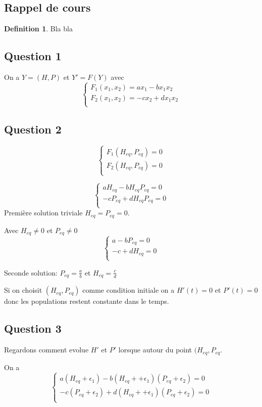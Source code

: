 \documentclass[]{book}
\theoremstyle{definition}
\newtheorem{defn}{Definition}
\begin{document}
\subsection*{Rappel de cours}
\begin{defn}
Bla bla
\end{defn}



\newpage
\subsection*{Question 1}
On a $Y = (H, P)$ et $Y' = F(Y)$ avec 
$$
\left\{
\begin{array}{l}
F_1(x_1, x_2) = a x_1 - b x_1 x_2 \\
F_2(x_1, x_2) = -c x_2 + dx_1x_2 \\
\end{array}
\right.
$$

\subsection*{Question 2}
$$
\left\{
\begin{array}{l}
F_1(H_{eq}, P_{eq}) = 0 \\
F_2(H_{eq}, P_{eq}) = 0 \\
\end{array}
\right.
$$

$$
\left\{
\begin{array}{l}
a H_{eq} - b H_{eq} P_{eq} = 0 \\
-cP_{eq} + d H_{eq} P_{eq} = 0 \\
\end{array}
\right.
$$
Premi\`ere solution triviale $H_{eq} = P_{eq} = 0$.

Avec $H_{eq} \neq 0$ et $P_{eq} \neq 0$
$$
\left\{
\begin{array}{l}
a  - b  P_{eq} = 0 \\
-c + d H_{eq}  = 0 \\
\end{array}
\right.
$$

Seconde solution: $P_{eq} = \frac{a}{b}$ et $H_{eq} = \frac{c}{d}$

Si on choisit $(H_{eq}, P_{eq})$ comme condition initiale on a $H'(t) = 0$ et $P'(t) = 0$ donc les populations restent constante dans le temps.

\subsection*{Question 3}
Regardons comment evolue $H'$ et $P'$ lorsque autour du point $(H_{eq}, P_{eq}$.

On a 
$$
\left\{
\begin{array}{l}
a (H_{eq}+\epsilon_1) - b (H_{eq}++\epsilon_1)(P_{eq}+\epsilon_2) = 0 \\
-c(P_{eq}+\epsilon_2) + d (H_{eq}++\epsilon_1)(P_{eq}+\epsilon_2) = 0 \\
\end{array}
\right.
$$
\end{document}
